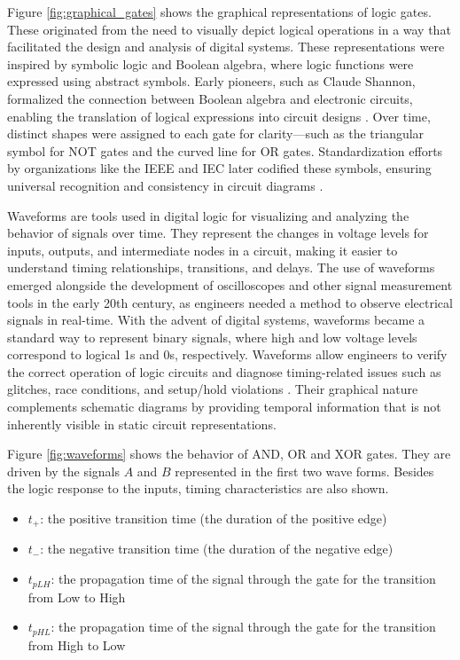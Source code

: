 Figure \ref{fig:graphical_gates} shows the graphical representations of logic gates. These originated from the need to visually depict logical operations in a way that facilitated the design and analysis of digital systems. These representations were inspired by symbolic logic and Boolean algebra, where logic functions were expressed using abstract symbols. Early pioneers, such as Claude Shannon, formalized the connection between Boolean algebra and electronic circuits, enabling the translation of logical expressions into circuit designs \cite{shannon48}. Over time, distinct shapes were assigned to each gate for clarity—such as the triangular symbol for NOT gates and the curved line for OR gates. Standardization efforts by organizations like the IEEE and IEC later codified these symbols, ensuring universal recognition and consistency in circuit diagrams \cite{ieee_std_91}. 


Waveforms are tools used in digital logic for visualizing and analyzing the behavior of signals over time. They represent the changes in voltage levels for inputs, outputs, and intermediate nodes in a circuit, making it easier to understand timing relationships, transitions, and delays. The use of waveforms emerged alongside the development of oscilloscopes and other signal measurement tools in the early 20th century, as engineers needed a method to observe electrical signals in real-time. With the advent of digital systems, waveforms became a standard way to represent binary signals, where high and low voltage levels correspond to logical 1s and 0s, respectively. Waveforms allow engineers to verify the correct operation of logic circuits and diagnose timing-related issues such as glitches, race conditions, and setup/hold violations \cite{horowitz1993, ieee_waveform}. Their graphical nature complements schematic diagrams by providing temporal information that is not inherently visible in static circuit representations.


Figure \ref{fig:waveforms} shows the behavior of AND, OR and XOR gates. They are driven by the signals $A$ and $B$ represented in the first two wave forms. Besides the logic response to the inputs, timing characteristics are also shown. 
\begin{itemize}
    \item $t_+$: the positive transition time (the duration of the positive edge)
    \item $t_-$: the negative transition time (the duration of the negative edge)
    \item $t_{pLH}$: the propagation time  of the signal through the gate for the transition from Low to High
    \item $t_{pHL}$: the propagation time  of the signal through the gate for the transition from High to Low
\end{itemize}

